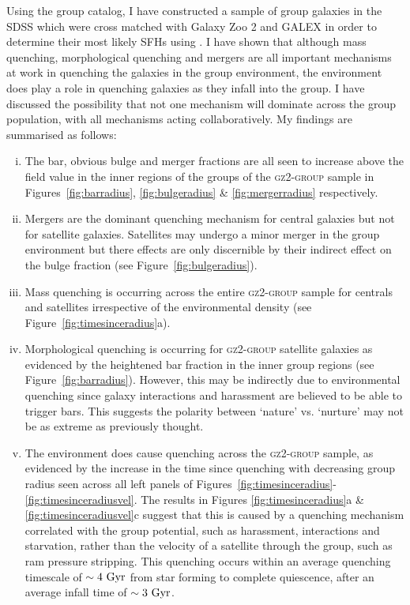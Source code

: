 Using the \citet{berlind06} group catalog, I have constructed a sample of group galaxies in the SDSS which were cross matched with Galaxy Zoo 2 and GALEX in order to determine their most likely SFHs using \starpy. I have shown that although mass quenching, morphological quenching and mergers are all important mechanisms at work in quenching the galaxies in the group environment, the environment does play a role in quenching galaxies as they infall into the group. I have discussed the possibility that not one mechanism will dominate across the group population, with all mechanisms acting collaboratively. My findings are summarised as follows:
\begin{enumerate}[(i)]
\item The bar, obvious bulge and merger fractions are all seen to increase above the field value in the inner regions of the groups of the \textsc{gz2-group} sample in Figures~\ref{fig:barradius}, \ref{fig:bulgeradius} \& \ref{fig:mergerradius} respectively.  
 
\item Mergers are the dominant quenching mechanism for central galaxies but not for satellite galaxies. Satellites may undergo a minor merger in the group environment but there effects are only discernible by their indirect effect on the bulge fraction (see Figure~\ref{fig:bulgeradius}).
 
 \item Mass quenching is occurring across the entire \textsc{gz2-group} sample for centrals and satellites irrespective of the environmental density (see Figure~\ref{fig:timesinceradius}a).
 
 \item Morphological quenching is occurring for \textsc{gz2-group} satellite galaxies as evidenced by the heightened bar fraction in the inner group regions (see Figure~\ref{fig:barradius}). However, this may be indirectly due to environmental quenching since galaxy interactions and harassment are believed to be able to trigger bars. This suggests the polarity between `nature' vs. `nurture' may not be as extreme as previously thought. 

 \item The environment does cause quenching across the \textsc{gz2-group} sample, as evidenced by the increase in the time since quenching with decreasing group radius seen across all left panels of Figures~\ref{fig:timesinceradius}-\ref{fig:timesinceradiusvel}. The results in Figures \ref{fig:timesinceradius}a \&  \ref{fig:timesinceradiusvel}c suggest that this is caused by a quenching mechanism correlated with the group potential, such as harassment, interactions and starvation, rather than the velocity of a satellite through the group, such as ram pressure stripping. This quenching occurs within an average quenching timescale of $\sim4~\rm{Gyr}$ from star forming to complete quiescence, after an average infall time of $\sim 3 ~\rm{Gyr}$. 
  

\end{enumerate}
